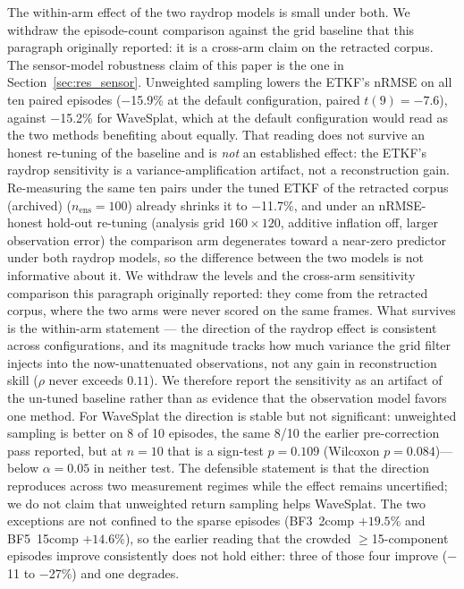 The within-arm effect of the two raydrop models is small under both. We withdraw
the episode-count comparison against the grid baseline that this paragraph
originally reported: it is a cross-arm claim on the retracted corpus. The
sensor-model robustness claim of this paper is the one in
Section~\ref{sec:res_sensor}.
Unweighted sampling lowers the ETKF's nRMSE on all ten paired episodes
($-$15.9\% at the default configuration, paired $t(9){=}-7.6$), against
$-$15.2\% for WaveSplat, which at the default configuration would read as
the two methods benefiting about equally.
That reading does not survive an honest re-tuning of the baseline and is
\emph{not} an established effect: the ETKF's raydrop sensitivity is a
variance-amplification artifact, not a reconstruction gain.  Re-measuring
the same ten pairs under the tuned ETKF of
the retracted corpus (archived) ($n_{\text{ens}}{=}100$) already
shrinks it to $-$11.7\%, and under an nRMSE-honest hold-out re-tuning
(analysis grid $160\times120$, additive inflation off, larger observation
error) the comparison arm degenerates toward a near-zero predictor under both
raydrop models, so the difference between the two models is not informative about
it. We withdraw the levels and the cross-arm sensitivity comparison this paragraph
originally reported: they come from the retracted corpus, where the two arms were
never scored on the same frames. What survives is the within-arm statement --- the
direction of the raydrop effect is consistent across configurations, and its
magnitude tracks how much variance the
grid filter injects into the now-unattenuated observations, not any gain
in reconstruction skill ($\rho$ never exceeds $0.11$).  We therefore
report the sensitivity as an artifact of the un-tuned baseline rather
than as evidence that the observation model favors one method.
For WaveSplat the direction is stable but not significant: unweighted
sampling is better on 8 of 10 episodes, the same 8/10 the earlier
pre-correction pass reported, but at $n=10$ that is a sign-test
$p=0.109$ (Wilcoxon $p=0.084$)---below $\alpha=0.05$ in neither test.
The defensible statement is that the direction reproduces across two
measurement regimes while the effect remains uncertified; we do not claim
that unweighted return sampling helps WaveSplat.
The two exceptions are not confined to the sparse episodes
(BF3~2comp $+19.5\%$ and BF5~15comp $+14.6\%$), so the earlier reading
that the crowded $\geq$15-component episodes improve consistently does
not hold either: three of those four improve ($-$11 to $-$27\%) and one
degrades.

